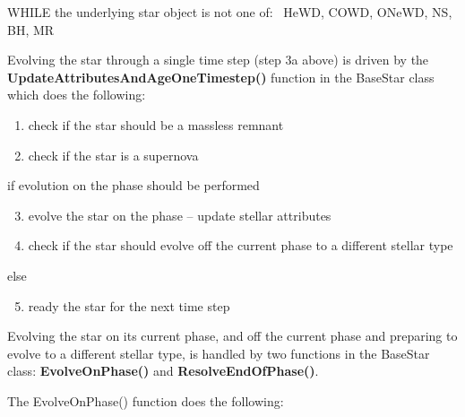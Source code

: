 \bigskip
\tabto{2em}WHILE the underlying star object is not one of: \lcb\ HeWD, COWD, ONeWD, NS, BH, MR\ \rcb

\bigskip
\bigskip
Evolving the star through a single time step (step 3a above) is driven by the \nobreak\textbf{UpdateAttributesAndAgeOneTimestep()} function in the BaseStar class which does the following:

\begin{enumerate}
    \item {check if the star should be a massless remnant}
    \item {check if the star is a supernova}
\end{enumerate}

\tabto{1.2em}if evolution on the phase should be performed

\hfill
\begin{minipage}{\dimexpr\textwidth-2em}
    \begin{enumerate}
        \setcounter{enumi}{2}
        \item  evolve the star on the phase -- update stellar attributes
        \item  check if the star should evolve off the current phase to a different stellar type
    \end{enumerate}
\end{minipage}

\medskip\tabto{1.2em}else

\hfill
\begin{minipage}{\dimexpr\textwidth-2em}
    \begin{enumerate}
        \setcounter{enumi}{4}
        \item  ready the star for the next time step
    \end{enumerate}
\end{minipage}

\newpage
Evolving the star on its current phase, and off the current phase and preparing to evolve to a different stellar type, is handled by two functions in the BaseStar class: \textbf{EvolveOnPhase()} and \textbf{ResolveEndOfPhase()}.

The EvolveOnPhase() function does the following:


